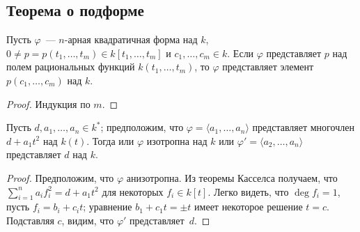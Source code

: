 \documentclass[a4paper,oneside,12pt]{article}
\theoremstyle{plain} { \swapnumbers
\newtheorem{theorem}{Теорема}[subsection]
\newtheorem{corollary}[theorem]{Следствие}
\newtheorem{lemma}[theorem]{Лемма}
\newtheorem{proposition}[theorem]{Утверждение}
\newtheorem{claim}[theorem]{Факт}
}
\theoremstyle{definition} { \swapnumbers
\newtheorem{definition}[theorem]{Определение}
\newtheorem{notation}[theorem]{Обозначение}
\newtheorem{remark}[theorem]{Замечание}
\newtheorem{remarks}[theorem]{Замечания}
\newtheorem{example}[theorem]{Пример}
\newtheorem{examples}[theorem]{Примеры}
\newtheorem{sssection}[theorem]{}
}
\def\ph{\varphi}
\def\la{\langle}
\def\ra{\rangle}
\begin{document}

\subsection{Теорема о подформе}

\begin{theorem}
Пусть $\ph$~--- $n$-арная квадратичная форма над $k$, $0\neq p=p(t_1,\dots,t_m)\in k[t_1,\dots,t_m]$
и $c_1,\dots,c_m\in k$. Если $\ph$ представляет $p$ над полем рациональных функций $k(t_1,\dots,t_m)$,
то $\ph$ представляет элемент $p(c_1,\dots,c_m)$ над $k$.
\end{theorem}
\begin{proof}
Индукция по $m$.
\end{proof}

\begin{lemma}
Пусть $d,a_1,\dots,a_n\in k^*$; предположим, что $\ph=\la a_1,\dots,a_n\ra$ представляет многочлен
$d+a_1t^2$ над $k(t)$. Тогда или $\ph$ изотропна над $k$ или $\ph'=\la a_2,\dots,a_n\ra$
представляет $d$ над $k$.
\end{lemma}
\begin{proof}
Предположим, что $\ph$ анизотропна.
Из теоремы Касселса получаем, что $\sum_{i=1}^n{a_if_i^2}=d+a_1t^2$ для некоторых $f_i\in k[t]$.
Легко видеть, что $\deg f_i=1$, пусть $f_i=b_i+c_it$; уравнение $b_1+c_1t=\pm t$ имеет некоторое
решение $t=c$. Подставляя $c$, видим, что $\ph'$ представляет~$d$.
\end{proof}
\end{document}
